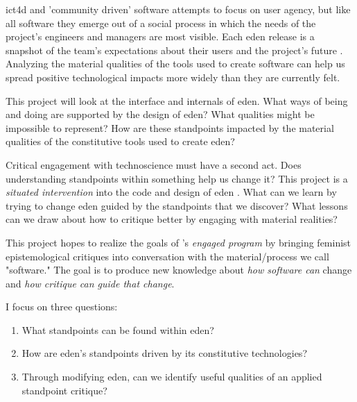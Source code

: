 \documentclass[a4paper,man,natbib]{apa6}
\begin{document}
   \acrshort{ict4d} and 'community driven' software attempts to focus on user agency, but like all software they emerge out of a social process in which the needs of the project's engineers and managers are most visible. Each \acrshort{eden} release is a snapshot of the team's expectations about their users and the project's future \citep{Mackenzie2006-hb}. Analyzing the material qualities of the tools used to create software can help us spread positive technological impacts more widely than they are currently felt.

   This project will look at the interface and internals of \acrshort{eden}. What ways of being and doing are supported by the design of \acrshort{eden}? What qualities might be impossible to represent? How are these standpoints impacted by the material qualities of the constitutive tools used to create \acrshort{eden}? 

   Critical engagement with technoscience must have a second act. Does understanding standpoints within something help us change it? This project is a \textit{situated intervention} into the code and design of \acrshort{eden} \citep{Zuiderent-Jerak2015-go}. What can we learn by trying to change \acrshort{eden} guided by the standpoints that we discover? What lessons can we draw about how to critique better by engaging with material realities?

   This project hopes to realize the goals of \citet{Sismondo2008-xz}'s \textit{engaged program} by bringing feminist epistemological critiques into conversation with the material/process we call "software." The goal is to produce new knowledge about \textit{how software can} change and \textit{how critique can guide that change}.
   \par
   \begin{flushleft}
   I focus on three questions:
   \end{flushleft}
   \begin{enumerate}
     \item What standpoints can be found within \acrshort{eden}?

     \item How are \acrshort{eden}'s standpoints driven by its constitutive technologies?

     \item Through modifying \acrshort{eden}, can we identify useful qualities of an applied standpoint critique?  
   \end{enumerate}
\end{document}
